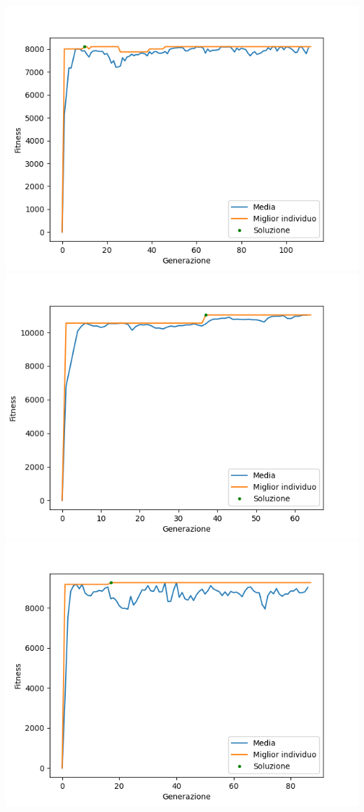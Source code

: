 \documentclass{CSUniSchoolLabReport}
\begin{document}
\pagebreak{}

\begin{center}
	\includegraphics[scale=0.25]{results/0}
	\includegraphics[scale=0.25]{results/1}
	\includegraphics[scale=0.25]{results/2}

\end{center}
\end{document}
